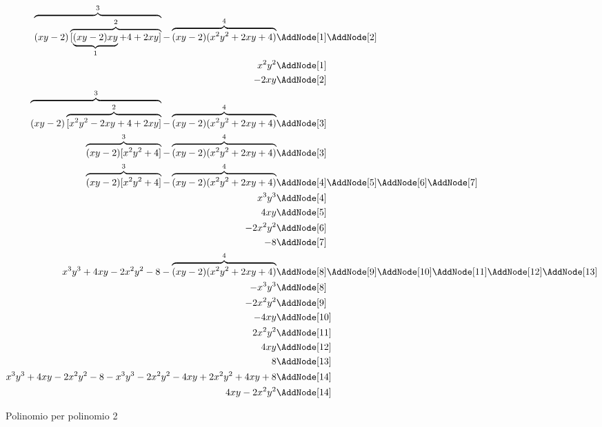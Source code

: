 \begin{figure}
	\begin{NodesList}
		
		\begin{align*}
			\overbrace{(xy-2)\overbrace{[\underbrace{(xy-2)xy}_{1}+4+2xy]}^{2}}^{3}-\overbrace{(xy-2)(x^2y^2+2xy+4)}^{4} &\AddNode[1]\AddNode[2]\\
			x^2y^2&\AddNode[1]\\ 
			-2xy&\AddNode[2] \\
			\overbrace{(xy-2)\overbrace{[x^2y^2-2xy+4+2xy]}^{2}}^{3}-\overbrace{(xy-2)(x^2y^2+2xy+4)}^{4} &\AddNode[3]\\
			\overbrace{(xy-2)[x^2y^2+4]}^{3}-\overbrace{(xy-2)(x^2y^2+2xy+4)}^{4} &\AddNode[3]\\
			\overbrace{(xy-2)[x^2y^2+4]}^{3}-\overbrace{(xy-2)(x^2y^2+2xy+4)}^{4} &\AddNode[4]\AddNode[5]\AddNode[6]\AddNode[7]\\
			x^3y^3&\AddNode[4]\\    
			4xy&\AddNode[5]\\
			-2x^2y^2&\AddNode[6]\\
			-8&\AddNode[7]\\
			x^3y^3+4xy-2x^2y^2-8-\overbrace{(xy-2)(x^2y^2+2xy+4)}^{4} &\AddNode[8]\AddNode[9]\AddNode[10]\AddNode[11]\AddNode[12]\AddNode[13]\\
			-x^3y^3&\AddNode[8]\\
			-2x^2y^2&\AddNode[9]\\
			-4xy&\AddNode[10]\\   
			2x^2y^2&\AddNode[11] \\ 
			4xy&\AddNode[12]\\     
			8&\AddNode[13]\\   
			x^3y^3+4xy-2x^2y^2-8-x^3y^3-2x^2y^2-4xy+2x^2y^2+4xy+8 &\AddNode[14]\\
			4xy-2x^2y^2 &\AddNode[14]
		\end{align*}
	\end{NodesList}
\caption[]{Polinomio per polinomio 2}
\label{fig:polinomioperpolinomio2}
\end{figure}
